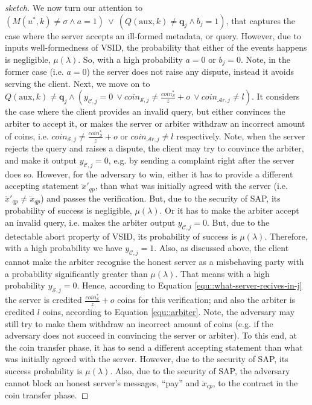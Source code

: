 \begin{proof}[sketch]
   
    
    We now turn our attention to $(M(u^{\scriptscriptstyle *},k)\neq \sigma \wedge a=1)\ \vee\ (Q(\text{aux},k)\neq \bm{q}_{\scriptscriptstyle j} \wedge b_{\scriptscriptstyle j}=1)$,   that captures the case where the server accepts an ill-formed metadata, or query. However, due to inputs well-formedness of VSID, the probability that either of the events happens is negligible, $\mu(\lambda)$. So, with a high probability $a=0$ or $b_{\scriptscriptstyle j}=0$.  Note, in the former case (i.e. $a=0$) the server does not raise any dispute, instead it avoids serving the client.  Next, we move on to      $Q(\text{aux},k)\neq \bm{q}_{\scriptscriptstyle j} \wedge
  (y_{\scriptscriptstyle\mathcal{C},j}=0 \ \vee  coin_{\scriptscriptstyle\mathcal{S},j}\neq \frac{coin_{\scriptscriptstyle\mathcal S}^{\scriptscriptstyle*}}{z}+o \ \vee  coin_{\scriptscriptstyle\mathcal{A}r,j}\neq l)$.  It considers the case where the client provides an invalid query, but  either convinces the arbiter to accept it, or  makes the server or arbiter  withdraw an incorrect amount of coins, i.e. $coin_{\scriptscriptstyle\mathcal{S},j}\neq \frac{coin_{\scriptscriptstyle\mathcal S}^{\scriptscriptstyle*}}{z}+o$ or  $coin_{\scriptscriptstyle\mathcal{A}r,j}\neq l$ respectively. Note, when the server rejects the query and raises a dispute, the client may try to convince the arbiter, and make it output $y_{\scriptscriptstyle \mathcal {C},j}=0$, e.g. by sending a complaint right after the server does so. However, for the adversary to win, either it has to provide a different accepting statement $\ddot{x}'_{\scriptscriptstyle qp}$, than what was initially agreed with the server (i.e. $\ddot{x}'_{\scriptscriptstyle qp}\neq \ddot{x}_{\scriptscriptstyle qp}$) and passes the verification. But,  due to the security of SAP, its probability of success is negligible, $\mu(\lambda)$. Or it has to make the arbiter  accept an invalid query, i.e. makes the arbiter output $y_{\scriptscriptstyle\mathcal{C},j}=0$. But, due to the detectable abort property of VSID, its probability of success is  $\mu(\lambda)$. Therefore, with a high probability we have $y_{\scriptscriptstyle\mathcal{C},j}=1$. Also, as discussed above, the client cannot make the arbiter recognise the  honest server as a misbehaving party with a probability significantly greater than $\mu(\lambda)$. That means with a high probability $y_{\scriptscriptstyle\mathcal{S},j}=0$. Hence, according to Equation \ref{equ::what-server-recives-in-j} the server is credited  $\frac{coin_{\scriptscriptstyle\mathcal S}^{\scriptscriptstyle*}}{z}+o$ coins for this verification; and also the arbiter is credited $l$ coins, according to Equation \ref{equ::arbiter}.  Note,  the adversary may still try to  make them withdraw an incorrect amount of coins (e.g. if the adversary does not succeed in convincing the server or arbiter). To this end, at the coin transfer phase, it has to send a  different accepting statement  than what was initially agreed with the server. However, due to the security of SAP, its  success probability is  $\mu(\lambda)$. Also, due to the security of SAP, the adversary cannot block an honest server's  messages, ``pay'' and $\ddot{x}_{\scriptscriptstyle cp}$, to the contract in the coin transfer phase.

\end{proof}
